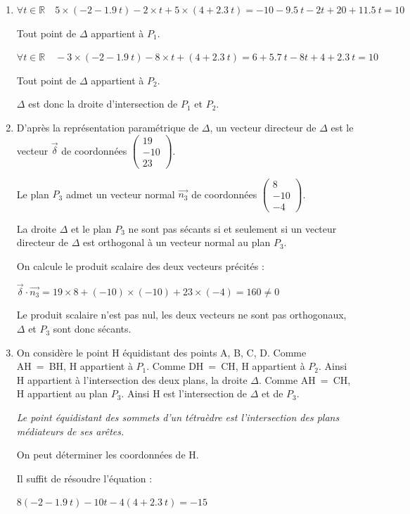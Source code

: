 \documentclass[10pt]{article}
\providecommand{\R}{\mathbb{R}}
\providecommand{\vect}[1]{\overrightarrow{#1}}
\providecommand{\np}[2][]{{#2~#1}}
\begin{document}
\begin{enumerate}
\begin{enumerate}
	On remarque que $\dfrac{5}{-2} \neq \dfrac{-3}{-2}$
	
	Ces deux vecteurs ne sont pas colinéaires car leur coordonnées ne sont pas proportionnelles.
		
	Comme les vecteurs normaux à $P_1$ et  $P_2$ ne sont pas colinéaires, alors les plans $P_1$ et  $P_2$ sont sécants.
	\end{enumerate}
	\item $\forall t \in \R\quad 5\times(-2-\np{1.9}t) - 2\times t + 5 \times (4+\np{2.3}t) = -10 -\np{9.5}t- 2t + 20 +  \np{11.5}t = 10 $
	
	Tout point de $\Delta$ appartient à $P_1$.
	
	$\forall t \in \R\quad -3\times(-2-\np{1.9}t) - 8\times t + (4+\np{2.3}t) = 6 +\np{5.7}t- 8t + 4 +  \np{2.3}t = 10 $
	
	Tout point de $\Delta$ appartient à $P_2$.
	
	$\Delta$ est donc la droite d'intersection de   $P_1$ et $P_2$.
	\item D'après la représentation paramétrique de $\Delta$, un vecteur directeur de $\Delta$ est le vecteur $\vect{\delta}$ de coordonnées $\left(
		\begin{array}{c}
		19\\
		-10\\
		23
		\end{array}
		\right)$.
		
		Le plan  $P_3$ admet un vecteur normal $\vect{n_3}$ de coordonnées $\left(
		\begin{array}{c}
		8\\
		-10\\
		-4
		\end{array}
		\right)$.
		
La droite $\Delta$ et le plan $P_3$ ne sont pas sécants si et seulement si un vecteur directeur de $\Delta$ est orthogonal à un vecteur normal au plan $P_3$.
		
On calcule le produit scalaire des deux vecteurs précités :
\renewcommand\arraystretch{1}

$\vect{\delta} \cdot \vect{n_3} = 19 \times 8 + (-10) \times (-10) + 23 \times (-4) = 160 \neq 0$

		
Le produit scalaire n'est pas nul, les deux vecteurs ne sont pas orthogonaux, $\Delta$ et $P_3$ sont donc sécants.
	\item On considère le point H équidistant des points A, B, C, D. Comme AH~=~BH, H appartient à $P_1$. Comme DH~=~CH, H appartient à $P_2$. Ainsi H appartient à l'intersection des deux plans, la droite $\Delta$. Comme AH~=~CH, H appartient au plan $P_3$. Ainsi H est l'intersection de  $\Delta$ et de  $P_3$.
	
	\emph{Le point équidistant des sommets d'un tétraèdre est l'intersection des plans médiateurs de ses arêtes.}
	
On peut déterminer les coordonnées de H.
	
Il suffit de résoudre l'équation :
	
$8(-2-\np{1.9}t) -10t -4(4+\np{2.3}t) = -15$


\end{enumerate}
\end{document}
